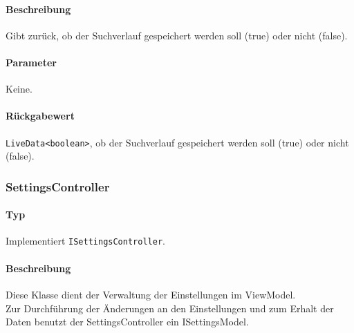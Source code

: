 \paragraph*{Beschreibung}
Gibt zurück, ob der Suchverlauf gespeichert werden soll (true) oder nicht (false).
\paragraph*{Parameter}
Keine.
\paragraph*{Rückgabewert}
\texttt{LiveData<boolean>}, ob der Suchverlauf gespeichert werden soll (true) oder nicht (false).

\subsubsection{SettingsController}
\paragraph*{Typ}
Implementiert \texttt{ISettingsController}.
\paragraph*{Beschreibung}
Diese Klasse dient der Verwaltung der Einstellungen im ViewModel. \\
Zur Durchführung der Änderungen an den Einstellungen und zum Erhalt der Daten benutzt der SettingsController ein ISettingsModel.
